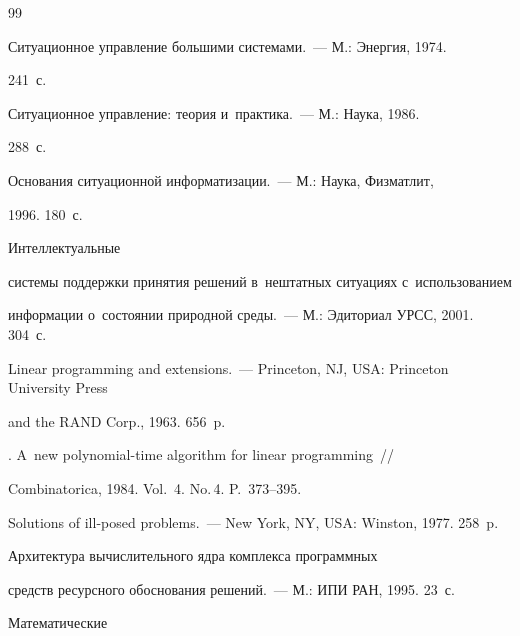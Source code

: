 {{\begin{thebibliography}{99}


 Ситуационное управление большими сис\-те\-ма\-ми.~--- М.: Энергия, 1974. 


241~с.




 Ситуационное управление: тео\-рия и~практика.~--- М.: Наука, 1986. 


288~с.










 Основания ситуационной информатизации.~--- М.: Наука, Физматлит, 


1996. 180~с.







 Интеллектуальные 


системы поддержки принятия решений в~нештатных ситуациях с~использованием 


информации о~со\-сто\-янии природной среды.~--- М.: Эдиториал УРСС, 2001. 304~с.







 Linear programming and extensions.~--- Princeton, NJ, USA: Princeton University Press 


and the RAND Corp., 1963. 656~p.




. A~new polynomial-time algorithm for linear programming~/\!\!/ 


Combinatorica, 1984. Vol.~4. No.\,4. P.~373--395. 




 Solutions of ill-posed problems.~--- New York, NY, USA: Winston, 1977. 258~p.




 Архитектура вы\-чис\-ли\-тель\-но\-го ядра комплекса про\-граммных 


средств ресурсного обоснования решений.~--- М.: ИПИ РАН, 1995. 23~с.




 Математические 



\end{thebibliography}}}
